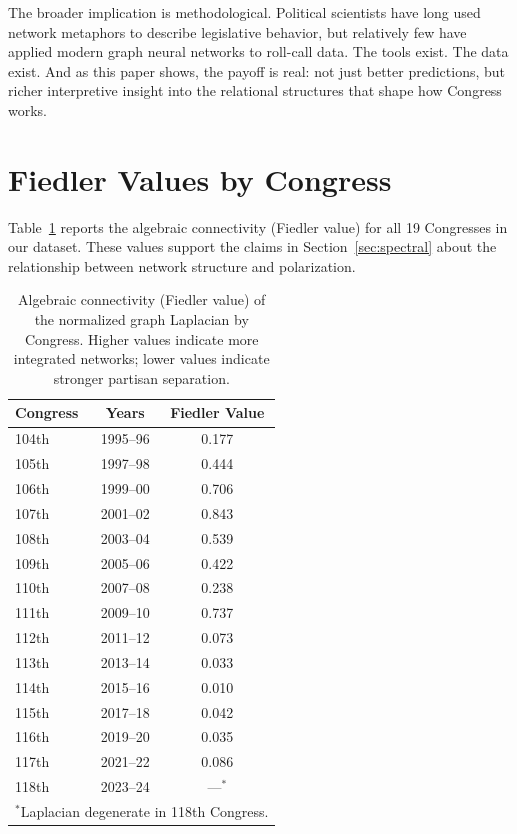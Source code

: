 \documentclass[11pt]{article}
\begin{document}
The broader implication is methodological. Political scientists have long used network metaphors to describe legislative behavior, but relatively few have applied modern graph neural networks to roll-call data. The tools exist. The data exist. And as this paper shows, the payoff is real: not just better predictions, but richer interpretive insight into the relational structures that shape how Congress works.


\appendix

\section{Fiedler Values by Congress}

Table~\ref{tab:fiedler} reports the algebraic connectivity (Fiedler value) for all 19 Congresses in our dataset. These values support the claims in Section~\ref{sec:spectral} about the relationship between network structure and polarization.

\begin{table}[H]
\centering
\caption{Algebraic connectivity (Fiedler value) of the normalized graph Laplacian by Congress. Higher values indicate more integrated networks; lower values indicate stronger partisan separation.}
\label{tab:fiedler}
\small
\begin{tabular}{lcc}
\toprule
Congress & Years & Fiedler Value \\
\midrule
104th & 1995--96 & 0.177 \\
105th & 1997--98 & 0.444 \\
106th & 1999--00 & 0.706 \\
107th & 2001--02 & 0.843 \\
108th & 2003--04 & 0.539 \\
109th & 2005--06 & 0.422 \\
110th & 2007--08 & 0.238 \\
111th & 2009--10 & 0.737 \\
112th & 2011--12 & 0.073 \\
113th & 2013--14 & 0.033 \\
114th & 2015--16 & 0.010 \\
115th & 2017--18 & 0.042 \\
116th & 2019--20 & 0.035 \\
117th & 2021--22 & 0.086 \\
118th & 2023--24 & ---$^*$ \\
\bottomrule
\multicolumn{3}{l}{$^*$Laplacian degenerate in 118th Congress.} \\
\end{tabular}
\end{table}
\end{document}
